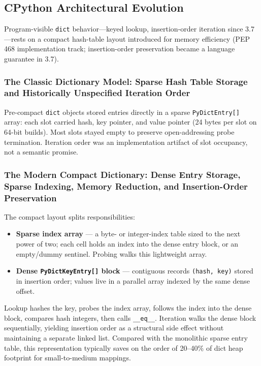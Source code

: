 \subsection{CPython Architectural Evolution}

Program-visible \texttt{dict} behavior---keyed lookup, insertion-order iteration since 3.7---rests on a compact hash-table layout introduced for memory efficiency (PEP 468 implementation track; insertion-order preservation became a language guarantee in 3.7).

\subsubsection{The Classic Dictionary Model: Sparse Hash Table Storage and Historically Unspecified Iteration Order}

Pre-compact \texttt{dict} objects stored entries directly in a sparse \texttt{PyDictEntry[]} array: each slot carried hash, key pointer, and value pointer (24 bytes per slot on 64-bit builds). Most slots stayed empty to preserve open-addressing probe termination. Iteration order was an implementation artifact of slot occupancy, not a semantic promise.

\subsubsection{The Modern Compact Dictionary: Dense Entry Storage, Sparse Indexing, Memory Reduction, and Insertion-Order Preservation}

The compact layout splits responsibilities:

\begin{itemize}
    \item \textbf{Sparse index array} --- a byte- or integer-index table sized to the next power of two; each cell holds an index into the dense entry block, or an empty/dummy sentinel. Probing walks this lightweight array.
    \item \textbf{Dense \texttt{PyDictKeyEntry[]} block} --- contiguous records \texttt{(hash, key)} stored in insertion order; values live in a parallel array indexed by the same dense offset.
\end{itemize}

Lookup hashes the key, probes the index array, follows the index into the dense block, compares hash integers, then calls \texttt{\_\_eq\_\_}. Iteration walks the dense block sequentially, yielding insertion order as a structural side effect without maintaining a separate linked list. Compared with the monolithic sparse entry table, this representation typically saves on the order of 20--40\% of dict heap footprint for small-to-medium mappings.

